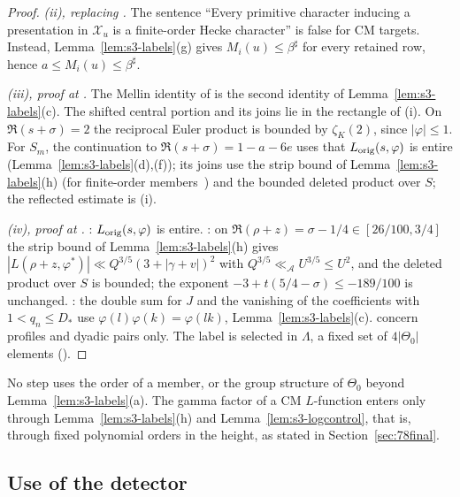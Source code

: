 \documentclass[11pt]{article}
\numberwithin{equation}{section}
\begin{document}
\begin{proof}
\emph{(ii), replacing \cite[Section~8.1]{OAI78}.} The sentence ``Every primitive character inducing a presentation in
$\mathcal X_u$ is a finite-order Hecke character'' is false for CM targets. Instead,
Lemma~\ref{lem:s3-labels}(g) gives $M_i(u)\le\beta^\sharp$ for every retained row, hence
$a\le M_i(u)\le\beta^\sharp$.

\emph{(iii), proof at \cite[proof of Lemma~8.2]{OAI78}.} The Mellin identity of \cite[proof of Lemma~8.2]{OAI78} is the second identity of
Lemma~\ref{lem:s3-labels}(c). The shifted central portion and its joins lie in the rectangle of (i). On
$\Re(s+\sigma)=2$ the reciprocal Euler product is bounded by $\zeta_K(2)$, since $|\varphi|\le1$. For
$S_m$, the continuation to $\Re(s+\sigma)=1-a-6e$ uses that $L_{\rm orig}(s,\varphi)$ is entire
(Lemma~\ref{lem:s3-labels}(d),(f)); its joins use the strip bound of Lemma~\ref{lem:s3-labels}(h) (for
finite-order members~\cite[eq.~(4.14)]{OAI78}) and the bounded deleted product over $S$;
the reflected estimate is (i).

\emph{(iv), proof at \cite[proof of Proposition~8.3]{OAI78}.} \cite[proof of Proposition~8.3]{OAI78}: $L_{\rm orig}(s,\varphi)$ is entire. \cite[proof of Proposition~8.3]{OAI78}: on
$\Re(\rho+z)=\sigma-1/4\in[26/100,3/4]$ the strip bound of Lemma~\ref{lem:s3-labels}(h) gives
$|L(\rho+z,\varphi^*)|\ll Q^{3/5}(3+|\gamma+v|)^2$ with $Q^{3/5}\ll_{\mathcal A}U^{3/5}\le U^2$, and the
deleted product over $S$ is bounded; the exponent $-3+t(5/4-\sigma)\le-189/100$ is unchanged.
\cite[proof of Proposition~8.3]{OAI78}: the double sum for $J$ and the vanishing of the coefficients with $1<q_n\le D_*$ use
$\varphi(l)\varphi(k)=\varphi(lk)$, Lemma~\ref{lem:s3-labels}(c). \cite[proof of Proposition~8.3]{OAI78} concern profiles and dyadic
pairs only. The label is selected in $\Lambda$, a fixed set of $4|\Theta_0|$ elements (\cite[Proposition~8.3]{OAI78}).
\end{proof}

No step uses the order of a member, or the group structure of $\Theta_0$ beyond
Lemma~\ref{lem:s3-labels}(a). The gamma factor of a CM $L$-function enters only through
Lemma~\ref{lem:s3-labels}(h) and Lemma~\ref{lem:s3-logcontrol}, that is, through fixed polynomial orders in
the height, as stated in Section~\ref{sec:78final}.

\subsection{Use of the detector}
\end{document}
